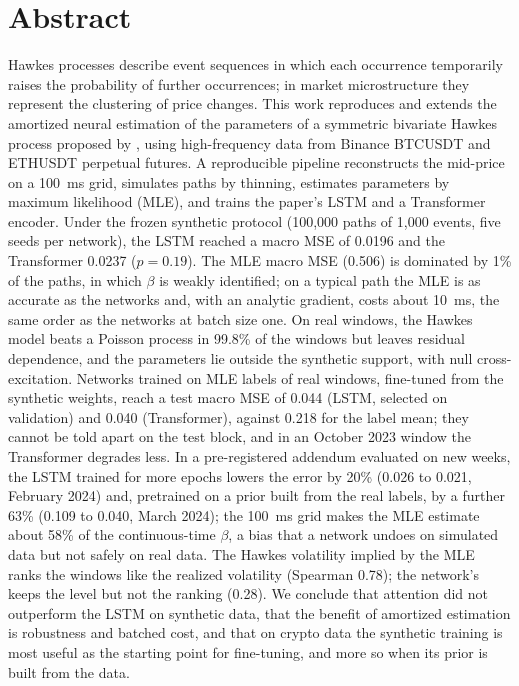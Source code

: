 \documentclass[12pt,a4paper,openany]{report}
\begin{document}
\clearpage{}
\chapter*{Abstract}

Hawkes processes describe event sequences in which each occurrence temporarily raises the
probability of further occurrences; in market microstructure they represent the clustering
of price changes. This work reproduces and extends the amortized neural estimation of the
parameters of a symmetric bivariate Hawkes process proposed by \citet{lee2023}, using
high-frequency data from Binance BTCUSDT and ETHUSDT perpetual futures. A reproducible
pipeline reconstructs the mid-price on a 100~ms grid, simulates paths by thinning, estimates parameters by maximum likelihood (MLE), and
trains the paper's LSTM and a Transformer encoder. Under the frozen synthetic protocol
(100,000 paths of 1,000 events, five seeds per network), the LSTM reached a macro MSE of
0.0196 and the Transformer 0.0237 ($p=0.19$). The MLE macro MSE (0.506) is dominated by 1\%
of the paths, in which $\beta$ is weakly identified; on a typical path the MLE is as accurate
as the networks and, with an analytic gradient, costs about 10~ms, the same order as the
networks at batch size one. On real windows, the Hawkes model beats a Poisson process in
99.8\% of the windows but leaves residual dependence, and the parameters lie outside the
synthetic support, with null cross-excitation. Networks trained on MLE labels of real
windows, fine-tuned from the synthetic weights, reach a test macro MSE of 0.044 (LSTM,
selected on validation) and 0.040 (Transformer), against 0.218 for the label mean; they
cannot be told apart on the test block, and in an October 2023 window the Transformer
degrades less. In a pre-registered addendum evaluated on new weeks, the LSTM trained for more
epochs lowers the error by 20\% (0.026 to 0.021, February 2024) and, pretrained on a prior
built from the real labels, by a further 63\% (0.109 to 0.040, March 2024); the 100~ms grid
makes the MLE estimate about 58\% of the continuous-time $\beta$, a bias that a network undoes
on simulated data but not safely on real data. The Hawkes volatility implied by the MLE ranks the windows like the realized
volatility (Spearman 0.78); the network's keeps the level but not the ranking (0.28). We
conclude that attention did not outperform the LSTM on synthetic data, that the benefit of
amortized estimation is robustness and batched cost, and that on crypto data the synthetic
training is most useful as the starting point for fine-tuning, and more so when its prior
is built from the data.
\end{document}
